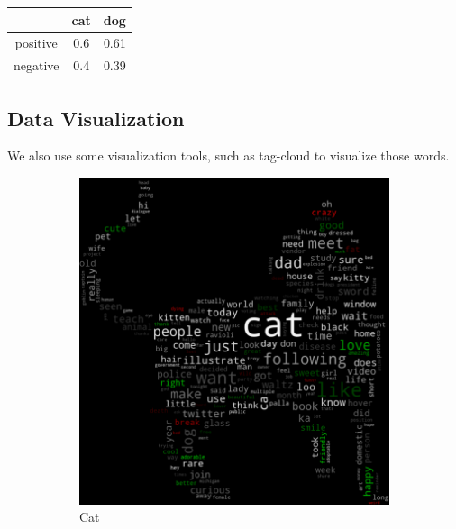 \documentclass[12pt]{article}
\begin{document}
\begin{center}
\begin{tabular}{ |c|c|c| }
 \hline
  & cat & dog \\ \hline
 positive & 0.6 & 0.61 \\ \hline
 negative & 0.4 & 0.39 \\ \hline
\end{tabular}
\end{center}

\subsection{Data Visualization}

We also use some visualization tools, such as tag-cloud to visualize those words.

\begin{figure}[h!]
  \centering
  \begin{subfigure}[b]{0.4\linewidth}
    \includegraphics[width=\linewidth]{../Sentiment/tag_cat.png}
    \caption{Cat}
  \end{subfigure}
  \begin{subfigure}[b]{0.437\linewidth}

\end{subfigure}
\end{figure}
\end{document}
